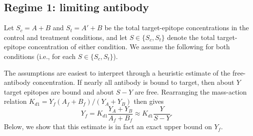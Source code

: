 \documentclass[11pt]{article}
\begin{document}
\subsection{Regime 1: limiting antibody}

Let $S_c=A+B$ and $S_t=A'+B$ be the total target-epitope
concentrations in the control and treatment conditions, and let
$S\in\{S_c,S_t\}$ denote the total target-epitope concentration of
either condition. We assume the following
for both conditions (i.e., for each $S\in\{S_c,S_t\}$).

The assumptions are easiest to interpret through a heuristic estimate of
the free-antibody concentration. If nearly all antibody is bound to
target, then about $Y$ target epitopes are bound and about $S-Y$ are free.
Rearranging the mass-action relation
$K_{d1}=Y_f(A_f+B_f)/(Y_A+Y_B)$ then gives
$$
Y_f
=K_{d1}\frac{Y_A+Y_B}{A_f+B_f}
\approx K_{d1}\frac{Y}{S-Y}.
$$
Below, we show that this estimate is in fact an exact upper bound on
$Y_f$.
\end{document}
